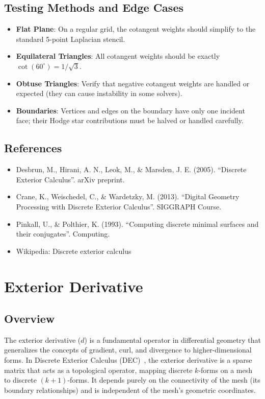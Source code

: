 \subsection{Testing Methods and Edge Cases}
\begin{itemize}
    \item \textbf{Flat Plane}: On a regular grid, the cotangent weights should simplify to the standard 5-point Laplacian stencil.
    \item \textbf{Equilateral Triangles}: All cotangent weights should be exactly $\cot(60^\circ) = 1/\sqrt{3}$.
    \item \textbf{Obtuse Triangles}: Verify that negative cotangent weights are handled or expected (they can cause instability in some solvers).
    \item \textbf{Boundaries}: Vertices and edges on the boundary have only one incident face; their Hodge star contributions must be halved or handled carefully.
\end{itemize}

\subsection{References}
\begin{itemize}
    \item Desbrun, M., Hirani, A. N., Leok, M., \& Marsden, J. E. (2005). ``Discrete Exterior Calculus''. arXiv preprint.
    \item Crane, K., Weischedel, C., \& Wardetzky, M. (2013). ``Digital Geometry Processing with Discrete Exterior Calculus''. SIGGRAPH Course.
    \item Pinkall, U., \& Polthier, K. (1993). ``Computing discrete minimal surfaces and their conjugates''. Computing.
    \item Wikipedia: Discrete exterior calculus
\end{itemize}


\section{Exterior Derivative}
\label{sec:exterior_derivative}

\subsection{Overview}
The exterior derivative ($d$) is a fundamental operator in differential geometry that generalizes the concepts of gradient, curl, and divergence to higher-dimensional forms. In Discrete Exterior Calculus (DEC)~\cite{desbrun2005,crane2013}, the exterior derivative is a sparse matrix that acts as a topological operator, mapping discrete $k$-forms on a mesh to discrete $(k+1)$-forms. It depends purely on the connectivity of the mesh (its boundary relationships) and is independent of the mesh's geometric coordinates.

